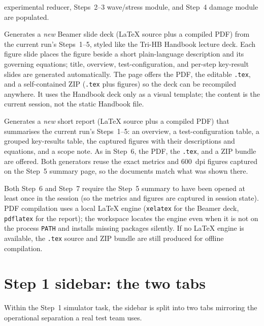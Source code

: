 \documentclass[11pt,a4paper,openany]{book}
\providecommand{\SI}[2]{\qty{#1}{#2}}
\theoremstyle{handbook}
\begin{document}
\begin{description}[leftmargin=2em,style=nextline]
    experimental reducer, Steps~2--3 wave/stress module, and Step~4 damage
    module are populated.
  \item[Step 6: Presentation]
    Generates a \emph{new} Beamer slide deck (LaTeX source plus a compiled
    PDF) from the current run's Steps~1--5, styled like the Tri-HB Handbook
    lecture deck. Each figure slide places the figure beside a short
    plain-language description and its governing equations; title, overview,
    test-configuration, and per-step key-result slides are generated
    automatically. The page offers the PDF, the editable \texttt{.tex}, and a
    self-contained ZIP (\texttt{.tex} plus figures) so the deck can be
    recompiled anywhere. It uses the Handbook deck only as a visual template;
    the content is the current session, not the static Handbook file.
  \item[Step 7: Report]
    Generates a \emph{new} short report (LaTeX source plus a compiled PDF)
    that summarises the current run's Steps~1--5: an overview, a
    test-configuration table, a grouped key-results table, the captured
    figures with their descriptions and equations, and a scope note. As in
    Step~6, the PDF, the \texttt{.tex}, and a ZIP bundle are offered. Both
    generators reuse the exact metrics and \SI{600}{dpi} figures captured on
    the Step~5 summary page, so the documents match what was shown there.
\end{description}

\noindent Both Step~6 and Step~7 require the Step~5 summary to have been
opened at least once in the session (so the metrics and figures are captured
in session state). PDF compilation uses a local \LaTeX{} engine
(\texttt{xelatex} for the Beamer deck, \texttt{pdflatex} for the report); the
workspace locates the engine even when it is not on the process \texttt{PATH}
and installs missing packages silently. If no \LaTeX{} engine is available,
the \texttt{.tex} source and ZIP bundle are still produced for offline
compilation.

\section{Step 1 sidebar: the two tabs}

Within the Step~1 simulator task, the sidebar is split into two tabs
mirroring the operational separation a real test team uses.
\end{document}
